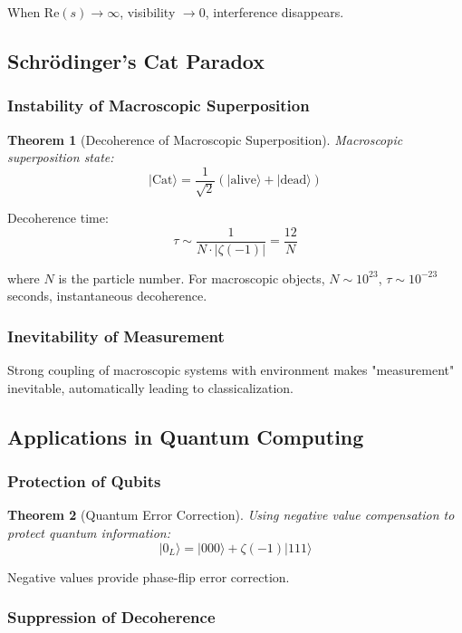\documentclass[11pt]{article}
\theoremstyle{plain}
\newtheorem{theorem}{Theorem}[section]
\theoremstyle{definition}
\theoremstyle{remark}
\begin{document}
When $\text{Re}(s) \to \infty$, visibility $\to 0$, interference disappears.

\subsection{Schrödinger's Cat Paradox}

\subsubsection{Instability of Macroscopic Superposition}

\begin{theorem}[Decoherence of Macroscopic Superposition]
Macroscopic superposition state:
$$|\text{Cat}\rangle = \frac{1}{\sqrt{2}}(|\text{alive}\rangle + |\text{dead}\rangle)$$
\end{theorem}

Decoherence time:
$$\tau \sim \frac{1}{N \cdot |\zeta(-1)|} = \frac{12}{N}$$

where $N$ is the particle number. For macroscopic objects, $N \sim 10^{23}$, $\tau \sim 10^{-23}$ seconds, instantaneous decoherence.

\subsubsection{Inevitability of Measurement}

Strong coupling of macroscopic systems with environment makes "measurement" inevitable, automatically leading to classicalization.

\subsection{Applications in Quantum Computing}

\subsubsection{Protection of Qubits}

\begin{theorem}[Quantum Error Correction]
Using negative value compensation to protect quantum information:
$$|0_L\rangle = |000\rangle + \zeta(-1)|111\rangle$$
\end{theorem}

Negative values provide phase-flip error correction.

\subsubsection{Suppression of Decoherence}
\end{document}
